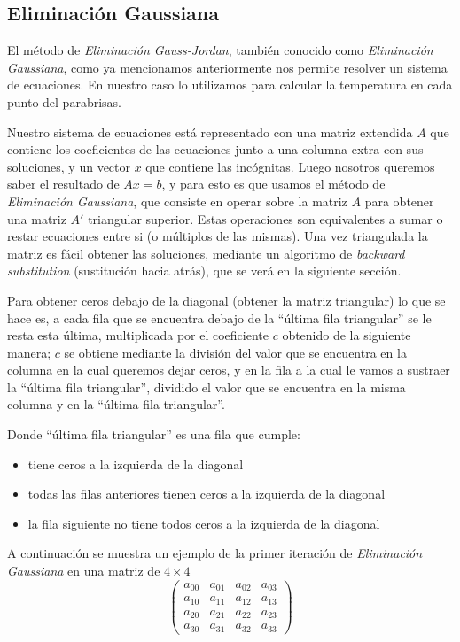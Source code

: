 \documentclass{article}
\begin{document}
\subsection{Eliminación Gaussiana}
El método de \textit{Eliminación Gauss-Jordan}, también conocido como \textit{Eliminación Gaussiana}, como ya mencionamos anteriormente nos permite resolver un sistema de ecuaciones. En nuestro caso lo utilizamos para calcular la temperatura en cada punto del parabrisas.

Nuestro sistema de ecuaciones está representado con una matriz extendida $A$ que contiene los coeficientes de las ecuaciones junto a una columna extra con sus soluciones, y un vector $x$ que contiene las incógnitas. Luego nosotros queremos saber el resultado de $Ax=b$, y para esto es que usamos el método de \textit{Eliminación Gaussiana}, que consiste en operar sobre la matriz $A$ para obtener una matriz $A'$ triangular superior. Estas operaciones son equivalentes a sumar o restar ecuaciones entre si (o múltiplos de las mismas). Una vez triangulada la matriz es fácil obtener las soluciones, mediante un algoritmo de \textit{backward substitution} (sustitución hacia atrás), que se verá en la siguiente sección.

Para obtener ceros debajo de la diagonal (obtener la matriz triangular) lo que se hace es, a cada fila que se encuentra debajo de la ``última fila triangular'' se le resta esta última, multiplicada por el coeficiente $c$ obtenido de la siguiente manera; $c$ se obtiene mediante la división del valor que se encuentra en la columna en la cual queremos dejar ceros, y en la fila a la cual le vamos a sustraer la ``última fila  triangular'', dividido el valor que se encuentra en la misma columna y en la ``última fila triangular''.

Donde ``última fila triangular'' es una fila que cumple:
\begin{itemize}
\item tiene ceros a la izquierda de la diagonal
\item todas las filas anteriores tienen ceros a la izquierda de la diagonal
\item la fila siguiente no tiene todos ceros a la izquierda de la diagonal
\end{itemize} 


A continuación se muestra un ejemplo de la primer iteración de \textit{Eliminación Gaussiana} en una matriz de 
$4 \times 4$
\[ \left( \begin{array}{cccc}
a_{00} & a_{01} & a_{02} & a_{03}\\
a_{10} & a_{11} & a_{12} & a_{13} \\
a_{20} & a_{21} & a_{22} & a_{23}\\
a_{30} & a_{31} & a_{32} & a_{33}\end{array} \right)\] 
\end{document}
